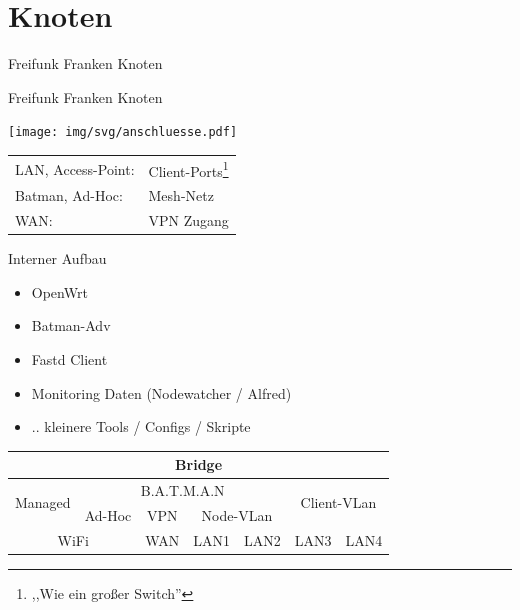 \section{Knoten}
\begin{frame}{}
    \begin{center}
        Freifunk Franken Knoten
     \end{center}
\end{frame}

\begin{frame}{Freifunk Franken Knoten}
    \begin{center}
        \texttt{[image: img/svg/anschluesse.pdf]}
    \end{center}
    \begin{tabular}{ll}
        LAN, Access-Point: & Client-Ports\footnote{,,Wie ein großer Switch''} \\
        Batman, Ad-Hoc: & Mesh-Netz \\
        WAN: & VPN Zugang \\
    \end{tabular}
\end{frame}

\begin{frame}{Interner Aufbau}
    \begin{itemize}
        \item OpenWrt
        \item Batman-Adv
        \item Fastd Client
        \item Monitoring Daten (Nodewatcher / Alfred)
        \item .. kleinere Tools / Configs / Skripte
    \end{itemize}

    \renewcommand{\arraystretch}{1.5}
    \begin{tabular}{|c|c|c|c|c|c|c|} \hline
         \multicolumn{7}{|c|}{Bridge} \\ \hline
         \multirow{2}{*}{Managed} &
         \multicolumn{4}{c|}{B.A.T.M.A.N} &
         \multicolumn{2}{c|}{\multirow{2}{*}{Client-VLan}} \\ \cline{2-5}
         & Ad-Hoc & VPN & \multicolumn{2}{c|}{Node-VLan} & \multicolumn{2}{c|}{} \\ \hline
         \multicolumn{2}{|c|}{WiFi} & WAN & LAN1 & LAN2 &
         LAN3 & LAN4 \\ \hline
    \end{tabular}
\end{frame}

